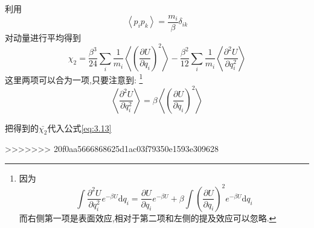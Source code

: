 利用 
\[\left< p_i p_k \right> =\dfrac{m_i}{\beta}\delta_{ik}\]
对动量进行平均得到
\begin{equation}
  \chi_2=\dfrac{\beta^{3}}{24}\sum_i \frac{1}{m_i}\left< \left( \dfrac{\partial U}{\partial q_i} \right) ^{2} \right> -\dfrac{\beta^{2}}{12}\sum_i \frac{1}{m_i}\left< \frac{\partial^2 U}{\partial q_i^2} \right> 
\end{equation}
这里两项可以合为一项,只要注意到:
\footnote{因为 
\[\int \frac{\partial^2 U}{\partial q_i^2}e^{-\beta U}\mathrm{d} q_i=\dfrac{\partial U}{\partial q_i}e^{-\beta U}+\beta\int\left( \dfrac{\partial U}{\partial q_i} \right) ^{2}e^{-\beta U}\mathrm{d}  q_i\]
而右侧第一项是表面效应,相对于第二项和左侧的提及效应可以忽略.}
\[\left< \frac{\partial^2 U}{\partial q_i^2} \right> =\beta \left< \left( \dfrac{\partial U}{\partial q_i} \right) ^{2} \right> \]

把得到的$\bar{\chi_2}$代入公式\eqref{eq:3.13}


>>>>>>> 20f0aa5666868625d1ac03f79350e1593e309628
